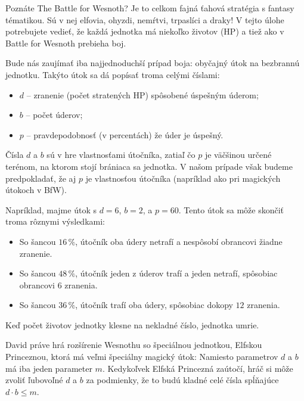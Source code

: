 

\usepackage[slovak]{babel}
\usepackage{wrapfig}





Poznáte The Battle for Wesnoth? Je to celkom fajná ťahová stratégia s fantasy tématikou. Sú v nej
elfovia, ohyzdi, nemŕtvi, trpaslíci a draky! V tejto úlohe potrebujete vedieť, že každá jednotka má niekoľko životov (HP) a tiež ako v Battle for Wesnoth prebieha boj.

Bude nás zaujímať iba najjednoduchší prípad boja: obyčajný útok na bezbrannú jednotku. Takýto útok
sa dá popísať troma celými číslami:

\begin{itemize}
 \item $d$ -- zranenie (počet stratených HP) spôsobené úspešným úderom;
 \item $b$ -- počet úderov;
 \item $p$ -- pravdepodobnosť (v percentách) že úder je úspešný.
\end{itemize}

Čísla $d$ a $b$ sú v hre vlastnosťami útočníka, zatiaľ čo $p$ je väčšinou určené terénom, na ktorom
stojí brániaca sa jednotka. V našom prípade však budeme predpokladať, že aj $p$ je vlastnosťou útočníka
(napríklad ako pri magických útokoch v BfW).

Napríklad, majme útok s $d=6$, $b=2$, a $p=60$. Tento útok sa môže skončiť troma rôznymi výsledkami:

\begin{itemize}
 \item So šancou $16\,\%$, útočník oba údery netrafí a nespôsobí obrancovi žiadne zranenie.
 \item So šancou $48\,\%$, útočník jeden z úderov trafí a jeden netrafí, spôsobiac obrancovi $6$ zranenia.
 \item So šancou $36\,\%$, útočník trafí oba údery, spôsobiac dokopy $12$ zranenia.
\end{itemize}

Keď počet životov jednotky klesne na nekladné číslo, jednotka umrie.

David práve hrá rozšírenie Wesnothu so špeciálnou jednotkou, Elfskou Princeznou, ktorá má veľmi špeciálny magický útok:
Namiesto parametrov $d$ a $b$ má iba jeden parameter $m$. Kedykoľvek Elfská Princezná zaútočí, hráč
si môže zvoliť ľubovoľné $d$ a $b$ za podmienky, že to budú kladné celé čísla spĺňajúce 
$d \cdot b \leq m$.

